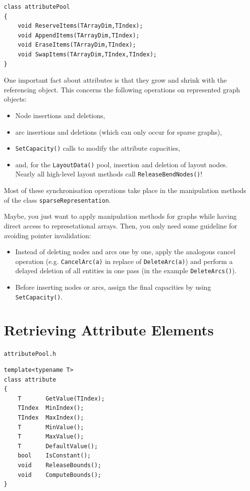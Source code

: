 \documentclass[a4paper,11pt,twoside]{book}
\begin{document}
\begin{multicols}{2}
\begin{mymethods}
\begin{verbatim}
class attributePool
{
    void ReserveItems(TArrayDim,TIndex);
    void AppendItems(TArrayDim,TIndex);
    void EraseItems(TArrayDim,TIndex);
    void SwapItems(TArrayDim,TIndex,TIndex);
}
\end{verbatim}
\end{mymethods}
One important fact about attributes is that they grow and shrink with the
referencing object. This concerns the following operations on represented
graph objects:
\begin{itemize}
\item Node insertions and deletions,
\item arc insertions and deletions (which can only occur for sparse graphs),
\item \verb/SetCapacity()/ calls to modify the attribute capacities,
\item and, for the \verb/LayoutData()/ pool, insertion and deletion of layout
    nodes. Nearly all high-level layout methods call \verb/ReleaseBendNodes()/!
\end{itemize}
Most of these synchronisation operations take place in the manipulation methods
of the class \verb/sparseRepresentation/.

Maybe, you just want to apply manipulation methods for graphs while having
direct access to represetational arrays. Then, you only need some guideline
for avoiding pointer invalidation:
\begin{itemize}
\item Instead of deleting nodes and arcs one by one, apply the analogous cancel
    operation (e.g. \verb/CancelArc(a)/ in replace of \verb/DeleteArc(a)/) and
    perform a delayed deletion of all entities in one pass (in the example
    \verb/DeleteArcs()/).
\item Before inserting nodes or arcs, assign the final capacities by using
    \verb/SetCapacity()/.
\end{itemize}


\section{Retrieving Attribute Elements}
\myinclude\verb/attributePool.h/
\begin{mymethods}
\begin{verbatim}
template<typename T>
class attribute
{
    T       GetValue(TIndex);
    TIndex  MinIndex();
    TIndex  MaxIndex();
    T       MinValue();
    T       MaxValue();
    T       DefaultValue();
    bool    IsConstant();
    void    ReleaseBounds();
    void    ComputeBounds();
}


\end{verbatim}
\end{mymethods}
\end{multicols}
\end{document}
